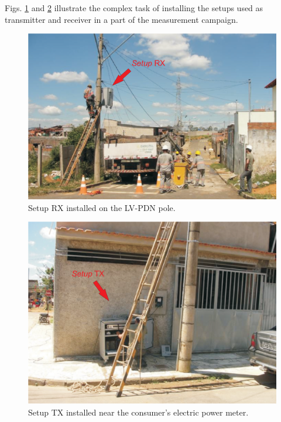 \documentclass[journal]{IEEEtran}
\begin{document}
	
	Figs. \ref{Fig:setupTX} and \ref{Fig:setupRX} illustrate the complex task of installing the setups used as transmitter and receiver in a part of the measurement campaign.
	\begin{figure}[!htp]
		\begin{centering}
			\includegraphics[scale=.4]{Figuras/setupRXnoposte.eps}
			\caption{Setup RX installed on the \ac{LV-PDN} pole.}
			\label{Fig:setupTX}
		\end{centering}
	\end{figure}
	
	\begin{figure}[!htp]
		\begin{centering}		
			\includegraphics[scale=.4]{Figuras/setupTXnoconsumidor.eps}
			\caption{Setup TX installed near the consumer's electric power meter.}
			\label{Fig:setupRX}
		\end{centering}
	\end{figure}
	
\end{document}
